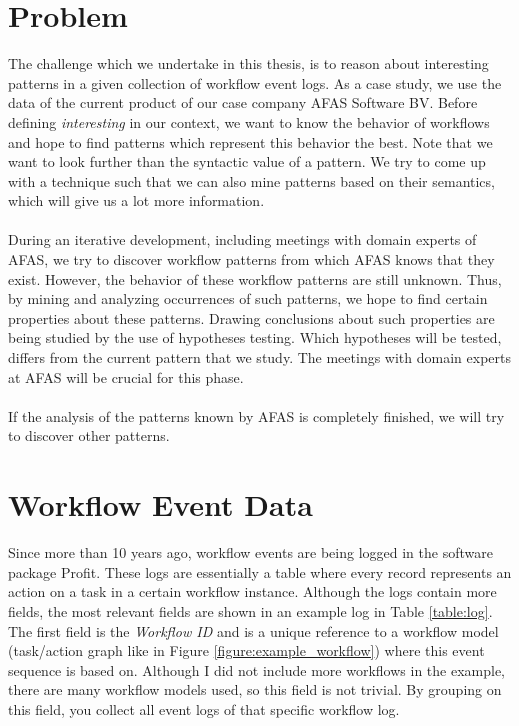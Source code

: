 \documentclass[a4paper,11pt]{article}
\begin{document}
\section{Problem}
The challenge which we undertake in this thesis, is to reason about interesting patterns in a given collection of workflow event logs. As a case study, we use the data of the current product of our case company AFAS Software BV. Before defining \textit{interesting} in our context, we want to know the behavior of workflows and hope to find patterns which represent this behavior the best. Note that we want to look further than the syntactic value of a pattern. We try to come up with a technique such that we can also mine patterns based on their semantics, which will give us a lot more information.\\
\\
During an iterative development, including meetings with domain experts of AFAS, we try to discover workflow patterns from which AFAS knows that they exist. However, the behavior of these workflow patterns are still unknown. Thus, by mining and analyzing occurrences of such patterns, we hope to find certain properties about these patterns. Drawing conclusions about such properties are being studied by the use of hypotheses testing. Which hypotheses will be tested, differs from the current pattern that we study. The meetings with domain experts at AFAS will be crucial for this phase.\\
\\
If the analysis of the patterns known by AFAS is completely finished, we will try to discover other patterns.


\section{Workflow Event Data}
Since more than 10 years ago, workflow events are being logged in the software package Profit. These logs are essentially a table where every record represents an action on a task in a certain workflow instance. Although the logs contain more fields, the most relevant fields are shown in an example log in Table \ref{table:log}. The first field is the \textit{Workflow ID} and is a unique reference to a workflow model (task/action graph like in Figure \ref{figure:example_workflow}) where this event sequence is based on. Although I did not include more workflows in the example, there are many workflow models used, so this field is not trivial. By grouping on this field, you collect all event logs of that specific workflow log.
\end{document}
